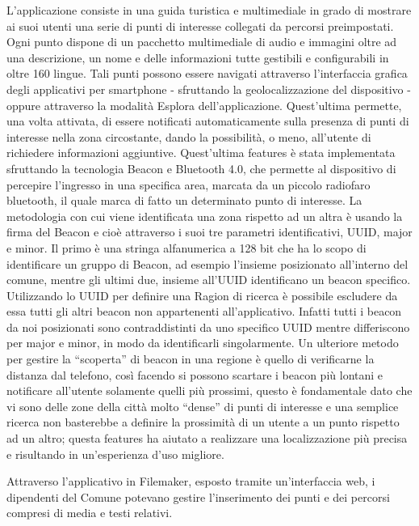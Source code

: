 L’applicazione consiste in una guida turistica e multimediale in grado di mostrare ai suoi utenti una serie di punti di interesse collegati da percorsi preimpostati. Ogni punto dispone di un pacchetto multimediale di audio e immagini oltre ad una descrizione, un nome e delle informazioni tutte gestibili e configurabili in oltre 160 lingue. Tali punti possono essere navigati attraverso l’interfaccia grafica degli applicativi per smartphone - sfruttando la geolocalizzazione del dispositivo - oppure attraverso la modalità Esplora dell’applicazione. Quest'ultima permette, una volta attivata, di essere notificati automaticamente sulla presenza di punti di interesse nella zona circostante, dando la possibilità, o meno, all’utente di richiedere informazioni aggiuntive. Quest’ultima features è stata implementata sfruttando la tecnologia Beacon e Bluetooth 4.0, che permette al dispositivo di percepire l’ingresso in una specifica area, marcata da un piccolo radiofaro bluetooth, il quale marca di fatto un determinato punto di interesse. La metodologia con cui viene identificata una zona rispetto ad un altra è usando la firma del Beacon e cioè attraverso i suoi tre parametri identificativi, UUID, major e minor. Il primo è una stringa alfanumerica a 128 bit che ha lo scopo di identificare un gruppo di Beacon, ad esempio l’insieme posizionato all’interno del comune, mentre gli ultimi due, insieme all’UUID identificano un beacon specifico. Utilizzando lo UUID per definire una Ragion di ricerca è possibile escludere da essa tutti gli altri beacon non appartenenti all’applicativo. Infatti tutti i beacon da noi posizionati sono contraddistinti da uno specifico UUID mentre differiscono per major e minor, in modo da identificarli singolarmente. Un ulteriore metodo per gestire la “scoperta” di beacon in una regione è quello di verificarne la distanza dal telefono, così facendo si possono scartare i beacon più lontani e notificare all’utente solamente quelli più prossimi, questo è fondamentale dato che vi sono delle zone della città molto “dense” di punti di interesse e una semplice ricerca non basterebbe a definire la prossimità di un utente a un punto rispetto ad un altro; questa features ha aiutato a realizzare una localizzazione più precisa e risultando in un’esperienza d’uso migliore.\vspace{5mm}

	Attraverso l’applicativo in Filemaker, esposto tramite un’interfaccia web, i dipendenti del Comune potevano gestire l’inserimento dei punti e dei percorsi compresi di media e testi relativi. \vspace{5mm}
	
